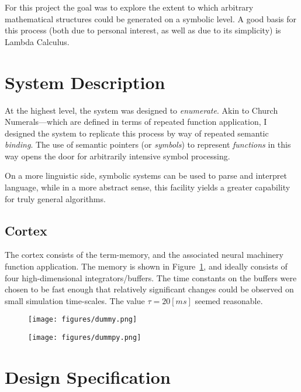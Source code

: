 \documentclass[journal]{IEEEtran}
\begin{document}
For this project the goal was to explore the extent to which arbitrary mathematical structures could be generated on a symbolic level.
A good basis for this process (both due to personal interest, as well as due to its simplicity) is Lambda Calculus.


\section{System Description}

At the highest level, the system was designed to \emph{enumerate}.
Akin to Church Numerals---which are defined in terms of repeated function application, I designed the system to replicate this process by way of repeated semantic \emph{binding}.
The use of semantic pointers (or \emph{symbols}) to represent \emph{functions} in this way opens the door for arbitrarily intensive symbol processing.

On a more linguistic side, symbolic systems can be used to parse and interpret language, while in a more abstract sense, this facility yields a greater capability for truly general algorithms.

\subsection{Cortex}

The cortex consists of the term-memory, and the associated neural machinery function application.
The memory is shown in Figure~\ref{fig:cortex:memory}, and ideally consists of four high-dimensional integrators/buffers.
The time constants on the buffers were chosen to be fast enough that relatively significant changes could be observed on small simulation time-scales.
The value $\tau=20 [ms]$ seemed reasonable.

\begin{figure}
	\centering
	\texttt{[image: figures/dummy.png]}
	\label{fig:cortex:memory}
\end{figure}


\begin{figure}
	\centering
	\texttt{[image: figures/dummpy.png]}
	\label{fig:cortex:applier}
\end{figure}

\section{Design Specification}
\end{document}
